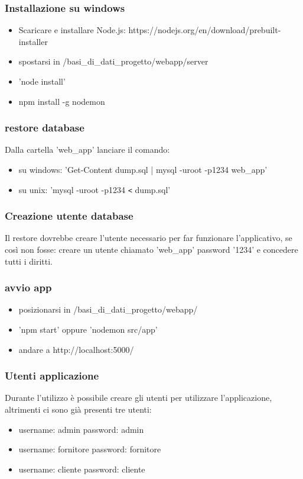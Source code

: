 \subsubsection{Installazione su windows}
\begin{itemize}
\item Scaricare e installare Node.js: https://nodejs.org/en/download/prebuilt-installer
\item spostarsi in /basi{\_}di{\_}dati{\_}progetto/webapp/server
\item 'node install'
\item npm install -g nodemon
\end{itemize}


\subsubsection{restore database}
Dalla cartella 'web{\_}app' lanciare il comando:
\begin{itemize}
\item su windows: 'Get-Content dump.sql | mysql -uroot -p1234 web{\_}app'
\item su unix: 'mysql -uroot -p1234 \texttt{<} dump.sql'
\end{itemize}

\subsubsection{Creazione utente database}
Il restore dovrebbe creare l'utente necessario per far funzionare l'applicativo, se così non fosse: creare un utente chiamato 'web{\_}app' password '1234' e concedere tutti i diritti.

\subsubsection{avvio app}
\begin{itemize}
\item  posizionarsi in /basi{\_}di{\_}dati{\_}progetto/webapp/
\item  'npm start' oppure 'nodemon src/app'
\item  andare a http://localhost:5000/
\end{itemize}

\subsubsection{Utenti applicazione}
Durante l'utilizzo è possibile creare gli utenti per utilizzare l'applicazione, altrimenti ci sono già presenti tre utenti:
\begin{itemize}
    \item  username: admin \hspace{1.5cm} password: admin
    \item  username: fornitore \hspace{1.5cm} password: fornitore
    \item  username: cliente \hspace{1.5cm} password: cliente
\end{itemize}